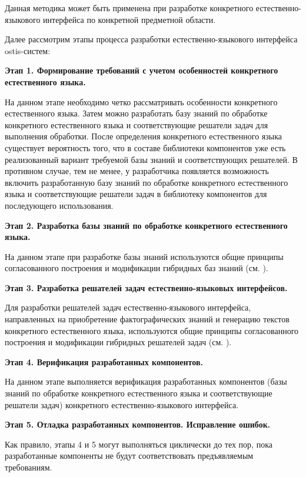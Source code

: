 {Данная методика может быть применена при разработке конкретного естественно-языкового интерфейса по конкретной предметной области.

Далее рассмотрим этапы процесса разработки естественно-языкового интерфейса ostis-систем:

\textbf{Этап 1. Формирование требований с учетом особенностей конкретного естественного языка.}

На данном этапе необходимо четко рассматривать особенности конкретного естественного языка.
Затем можно разработать базу знаний по обработке конкретного естественного языка и соответствующие решатели задач для выполнения обработки.
После определения конкретного естественного языка существует вероятность того, что в составе библиотеки компонентов уже есть реализованный вариант требуемой базы знаний и соответствующих решателей.
В противном случае, тем не менее, у разработчика появляется возможность включить разработанную базу знаний по обработке конкретного естественного языка и соответствующие решатели задач в библиотеку компонентов для последующего использования.

\textbf{Этап 2. Разработка базы знаний по обработке конкретного естественного языка.}

На данном этапе при разработке базы знаний используются общие принципы согласованного построения и модификации гибридных баз знаний (см. ).

\textbf{Этап 3. Разработка решателей задач естественно-языковых интерфейсов.}

Для разработки решателей задач естественно-языкового интерфейса, направленных на приобретение фактографических знаний и генерацию текстов конкретного естественного языка, используются общие принципы согласованного построения и модификации гибридных решателей задач (см. ).

\textbf{Этап 4. Верификация разработанных компонентов.}

На данном этапе выполняется верификация разработанных компонентов (базы знаний по обработке конкретного естественного языка и соответствующие решатели задач) конкретного естественно-языкового интерфейса.

\textbf{Этап 5. Отладка разработанных компонентов. Исправление ошибок.}

Как правило, этапы 4 и 5 могут выполняться циклически до тех пор, пока разработанные компоненты не будут соответствовать предъявляемым требованиям.

}
